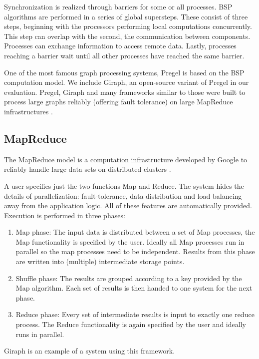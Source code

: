 Synchronization is realized through barriers for some or all processes.
BSP algorithms are performed in a series of global supersteps. These consist of three steps, beginning with the processors performing local computations concurrently.
This step can overlap with the second, the communication between components. Processes can exchange information to access remote data.
Lastly, processes reaching a barrier wait until all other processes have reached the same barrier.

One of the most famous graph processing systems, Pregel \cite{pregel} is based on the BSP computation model. We include Giraph, an open-source variant of Pregel in our evaluation.
Pregel, Giraph and many frameworks similar to those were built to process large graphs reliably (offering fault tolerance) on large MapReduce infrastructures \cite{Giraph,graphx,powergraph}.

\subsection{MapReduce}
The MapReduce model is a computation infrastructure developed by Google to reliably handle large data sets on distributed clusters \cite{mapreduce}.

A user specifies just the two functions Map and Reduce.
The system hides the details of parallelization: fault-tolerance, data distribution and load balancing away from the application logic.
All of these features are automatically provided.
Execution is performed in three phases:
\begin{enumerate}
	\item Map phase: The input data is distributed between a set of Map processes, the Map functionality is specified by the user. Ideally all Map processes run in parallel so the map processes need to be independent. Results from this phase are written into (multiple) intermediate storage points.
	\item Shuffle phase: The results are grouped according to a key provided by the Map algorithm. Each set of results is then handed to one system for the next phase.
	\item Reduce phase: Every set of intermediate results is input to exactly one reduce process. The Reduce functionality is again specified by the user and ideally runs in parallel.
\end{enumerate}
Giraph \cite{Giraph} is an example of a system using this framework.

